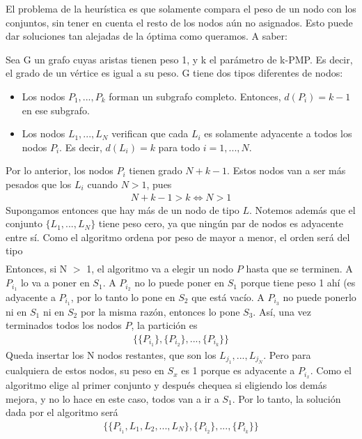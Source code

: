 El problema de la heurística es que solamente compara el peso de un nodo con los conjuntos, sin tener en cuenta el resto de los nodos aún no asignados. Esto puede dar soluciones tan alejadas de la óptima como queramos. A saber:

Sea G un grafo cuyas aristas tienen peso 1, y k el parámetro de k-PMP. Es decir, el grado de un vértice es igual a su peso. G tiene dos tipos diferentes de nodos:
\begin{itemize}
    \item Los nodos $P_1, ..., P_k$ forman un subgrafo completo. Entonces, $d(P_i) = k-1$ en ese subgrafo.
    \item Los nodos $L_1, ..., L_N$ verifican que cada $L_i$ es solamente adyacente a todos los nodos $P_i$. Es decir, $d(L_i) = k$ para todo $i = 1, ..., N$.
\end{itemize}
Por lo anterior, los nodos $P_i$ tienen grado $N+k-1$. Estos nodos van a ser más pesados que los $L_i$ cuando $N > 1$, pues 
\begin{align*}
N+k-1 > k \Longleftrightarrow N > 1
\end{align*}
Supongamos entonces que hay más de un nodo de tipo $L$. Notemos además que el conjunto $\{L_1, ..., L_N\}$ tiene peso cero, ya que ningún par de nodos es adyacente entre sí.
Como el algoritmo ordena por peso de mayor a menor, el orden será del tipo 
\begin{align*}
[P_{i_1},...,P_{i_k},L_{j_1},...,L_{j_N}]
\end{align*}
Entonces, si N $>$ 1, el algoritmo va a elegir un nodo $P$ hasta que se terminen. A $P_{i_1}$ lo va a poner en $S_1$. A $P_{i_2}$ no lo puede poner en $S_1$ porque tiene peso 1 ahí (es adyacente a $P_{i_1}$, por lo tanto lo pone en $S_2$ que está vacío. A $P_{i_3}$ no puede ponerlo ni en $S_1$ ni en $S_2$ por la misma razón, entonces lo pone $S_3$. Así, una vez terminados todos los nodos $P$, la partición es
\begin{align*}
\{\{P_{i_1}\},\{P_{i_2}\},...,\{P_{i_k}\}\}
\end{align*}
Queda insertar los N nodos restantes, que son los $L_{j_1},...,L_{j_N}$. Pero para cualquiera de estos nodos, su peso en $S_x$ es 1 porque es adyacente a $P_{i_x}$. Como el algoritmo elige al primer conjunto y después chequea si eligiendo los demás mejora, y no lo hace en este caso, todos van a ir a $S_1$. Por lo tanto, la solución dada por el algoritmo será
\begin{align*}
\{ \{P_{i_1}, L_1, L_2, ..., L_N\}, \{P_{i_2}\}, ..., \{P_{i_k}\} \}
\end{align*}
